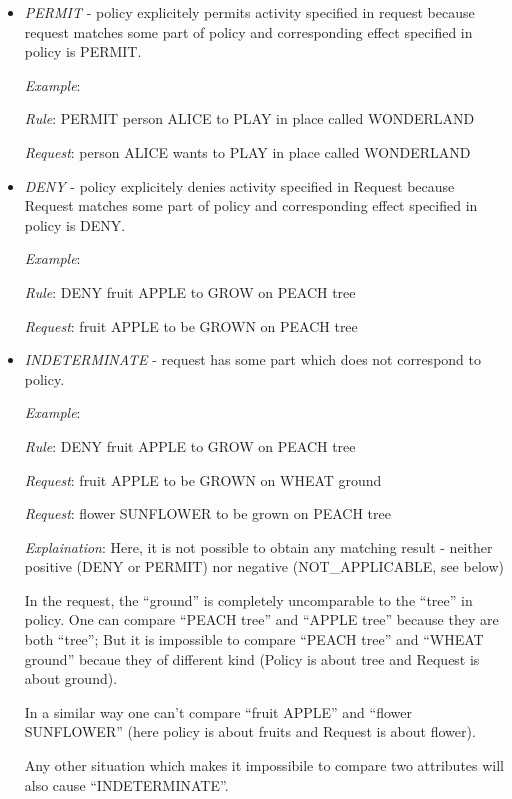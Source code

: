\documentclass{article}                            %
\begin{document}
\begin{itemize}
    \item  \emph{PERMIT} - policy explicitely permits activity specified in request because request matches some part of policy and corresponding effect specified in policy is PERMIT.

        \emph{Example}:

            \emph{Rule}: PERMIT person ALICE to PLAY in place called WONDERLAND

            \emph{Request}: person ALICE wants to PLAY in place called WONDERLAND

    \item  \emph{DENY} - policy explicitely denies activity specified in Request because Request matches some part of policy and corresponding effect specified in policy is DENY.

        \emph{Example}:

            \emph{Rule}: DENY fruit APPLE to GROW on PEACH tree

            \emph{Request}: fruit APPLE to be GROWN on PEACH tree

    \item  \emph{INDETERMINATE} - request has some part which does not correspond to policy.

        \emph{Example}:

            \emph{Rule}: DENY fruit APPLE to GROW on PEACH tree

            \emph{Request}: fruit APPLE to be GROWN on WHEAT ground

            \emph{Request}: flower SUNFLOWER to be grown on PEACH tree

        \emph{Explaination}: Here, it is not possible to obtain any matching result - neither positive (DENY or PERMIT) nor negative (NOT\_APPLICABLE, see below)

In the request, the ``ground'' is completely uncomparable to the ``tree'' in policy. One can compare ``PEACH tree'' and ``APPLE tree'' because they are both ``tree''; But it is impossible to compare ``PEACH tree'' and ``WHEAT ground'' becaue they of different kind (Policy is about tree and Request is about ground).

In a similar way one can't compare ``fruit APPLE'' and ``flower SUNFLOWER'' (here policy is about fruits and Request is about flower).

Any other situation which makes it impossibile to compare two attributes will also cause ``INDETERMINATE''.


\end{itemize}
\end{document}
